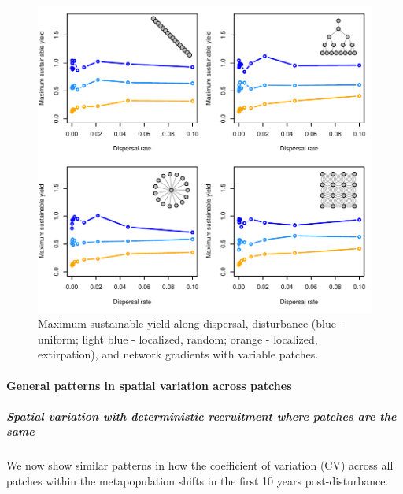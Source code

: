 \documentclass[]{article}
\let\oldparagraph\paragraph
\renewcommand{\paragraph}[1]{\oldparagraph{#1}\mbox{}}
\let\oldsubparagraph\subparagraph
\renewcommand{\subparagraph}[1]{\oldsubparagraph{#1}\mbox{}}
\begin{document}
\begin{figure}[H]

{\centering \includegraphics{Managing_for_ecological_surprises_in_metapopulations_makeHTML_files/figure-latex/MSY with variable patches and space-time stochasticity-1} 

}

\caption{Maximum sustainable yield along dispersal, disturbance (blue - uniform; light blue - localized, random; orange - localized, extirpation), and network gradients with variable patches.}\label{fig:MSY with variable patches and space-time stochasticity}
\end{figure}

\hypertarget{general-patterns-in-spatial-variation-across-patches}{%
\paragraph{General patterns in spatial variation across
patches}\label{general-patterns-in-spatial-variation-across-patches}}

\hypertarget{spatial-variation-with-deterministic-recruitment-where-patches-are-the-same}{%
\subparagraph{Spatial variation with deterministic recruitment where
patches are the
same}\label{spatial-variation-with-deterministic-recruitment-where-patches-are-the-same}}

We now show similar patterns in how the coefficient of variation (CV)
across all patches within the metapopulation shifts in the first 10
years post-disturbance.
\end{document}
